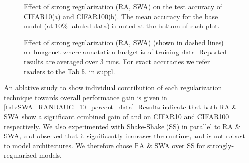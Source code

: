 \documentclass[10pt,twocolumn,letterpaper]{article}
\begin{document}
\begin{figure*}
\begin{center}
  \vspace{-2em}
\end{center}
    \caption{Effect of strong regularization (RA, SWA) on the test accuracy of CIFAR10(a) and CIFAR100(b). The mean accuracy for the base model (at 10\% labeled data) is noted at the bottom of each plot.}
    
\label{fig:cifar_randaug_swa_exp}
  \vspace{-1em}
\end{figure*}

\begin{figure*}
\begin{center}
  \vspace{-2em}
\end{center}
    \caption{Effect of strong regularization (RA, SWA) (shown in dashed lines) on Imagenet where annotation budget is  of training data. Reported results are averaged over 3 runs. For exact accuracies we refer readers to the Tab 5. in suppl.}
    \label{fig:imagenet_regularize}
  \vspace{-1em}
\end{figure*}

\noindent An ablative study to show individual contribution of each regularization technique towards overall performance gain is given in \cref{tab:SWA_RANDAUG_10_percent_data}. Results indicate that both RA \& SWA show a significant combined gain of  and  on CIFAR10 and CIFAR100 respectively. We also experimented with Shake-Shake (SS) \cite{shake-shake_gastaldi2017shake} in parallel to RA \& SWA, and observed that it significantly increases the runtime, and is not robust to model architectures. We therefore chose RA \& SWA over SS for strongly-regularized models.
\end{document}
